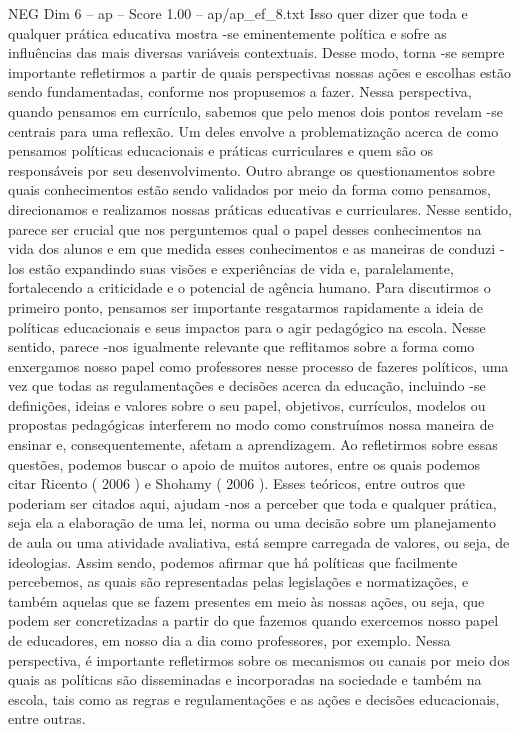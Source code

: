 \begin{textsample}{NEG Dim 6 – ap – Score 1.00 – ap/ap\_ef\_8.txt}
Isso quer dizer que toda e qualquer prática educativa mostra -se eminentemente política e sofre as influências das mais diversas variáveis contextuais.
Desse modo, torna -se sempre importante refletirmos a partir de quais perspectivas nossas ações e escolhas estão sendo fundamentadas, conforme nos propusemos a fazer.
Nessa perspectiva, quando pensamos em currículo, sabemos que pelo menos dois pontos revelam -se centrais para uma reflexão.
Um deles envolve a problematização acerca de como pensamos políticas educacionais e práticas curriculares e quem são os responsáveis por seu desenvolvimento.
Outro abrange os questionamentos sobre quais conhecimentos estão sendo validados por meio da forma como pensamos, direcionamos e realizamos nossas práticas educativas e curriculares.
Nesse sentido, parece ser crucial que nos perguntemos qual o papel desses conhecimentos na vida dos alunos e em que medida esses conhecimentos e as maneiras de conduzi -los estão expandindo suas visões e experiências de vida e, paralelamente, fortalecendo a criticidade e o potencial de agência humano.
Para discutirmos o primeiro ponto, pensamos ser importante resgatarmos rapidamente a ideia de políticas educacionais e seus impactos para o agir pedagógico na escola.
Nesse sentido, parece -nos igualmente relevante que reflitamos sobre a forma como enxergamos nosso papel como professores nesse processo de fazeres políticos, uma vez que todas as regulamentações e decisões acerca da educação, incluindo -se definições, ideias e valores sobre o seu papel, objetivos, currículos, modelos ou propostas pedagógicas interferem no modo como construímos nossa maneira de ensinar e, consequentemente, afetam a aprendizagem.
Ao refletirmos sobre essas questões, podemos buscar o apoio de muitos autores, entre os quais podemos citar Ricento ( 2006 ) e Shohamy ( 2006 ).
Esses teóricos, entre outros que poderiam ser citados aqui, ajudam -nos a perceber que toda e qualquer prática, seja ela a elaboração de uma lei, norma ou uma decisão sobre um planejamento de aula ou uma atividade avaliativa, está sempre carregada de valores, ou seja, de ideologias.
Assim sendo, podemos afirmar que há políticas que facilmente percebemos, as quais são representadas pelas legislações e normatizações, e também aquelas que se fazem presentes em meio às nossas ações, ou seja, que podem ser concretizadas a partir do que fazemos quando exercemos nosso papel de educadores, em nosso dia a dia como professores, por exemplo.
Nessa perspectiva, é importante refletirmos sobre os mecanismos ou canais por meio dos quais as políticas são disseminadas e incorporadas na sociedade e também na escola, tais como as regras e regulamentações e as ações e decisões educacionais, entre outras.

\end{textsample}

